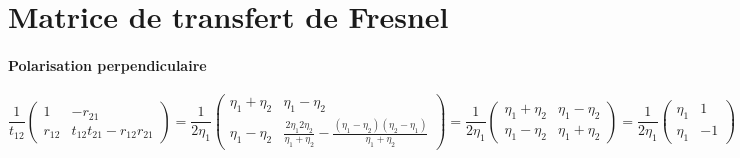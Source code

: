 \documentclass[a4paper,english]{article}
\begin{document}
\section{Matrice de transfert de Fresnel}
\paragraph{Polarisation perpendiculaire}
\begin{dmath}\label{mfress}
\frac{1}{t_{12}}\begin{pmatrix} 1 & -r_{21} \\ r_{12} & t_{12}t_{21} - r_{12}r_{21} \end{pmatrix} =
\frac{1}{2 \eta_1} \begin{pmatrix} \eta_1 + \eta_2 & \eta_1 - \eta_2 \\ \eta_1 - \eta_2 & \frac{2 \eta_1 2 \eta_2}{\eta_1 + \eta_2} - \frac{(\eta_1 - \eta_2)(\eta_2 - \eta_1)}{\eta_1 + \eta_2} \end{pmatrix} =
\frac{1}{2 \eta_1} \begin{pmatrix} \eta_1 + \eta_2 & \eta_1 - \eta_2 \\ \eta_1 - \eta_2 & \eta_1 + \eta_2 \end{pmatrix} =
\frac{1}{2 \eta_1} \begin{pmatrix} \eta_1 & 1 \\ \eta_1 & -1 \end{pmatrix}\begin{pmatrix} 1 & 1 \\ \eta_2 & -\eta_2 \end{pmatrix}
\end{dmath}
\end{document}
